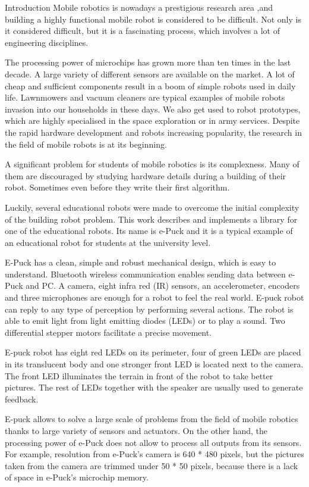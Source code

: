 {Introduction}
\label{chap:intro}
	Mobile robotics is nowadays a prestigious research area ,and building a highly functional 
	mobile robot is considered to be difficult. 
	Not only is it considered difficult, but it is a fascinating process, which
	involves a lot of engineering disciplines.
	
	The processing power of microchips has grown more than ten times in the last decade. 
	A large variety of different sensors are available on the market.	
	A lot of cheap and sufficient components result in a boom of simple robots used in daily life. 
	Lawnmowers and vacuum cleaners are typical examples of mobile robots invasion into our households in these days.
	We also get used to robot prototypes, which are highly specialised in the space exploration or in army services.
	Despite the rapid hardware development and robots increasing popularity,
	the research in the field of mobile robots is at its beginning. 
	
	A significant problem for students of mobile robotics is its complexness. Many of them are discouraged by
	studying hardware  details during a building of their robot. 
	Sometimes even before they write  their first algorithm.

	Luckily, several educational robots were made to overcome the initial complexity of the building robot problem.	
	This work describes and implements a library for one of the educational robots.
	Its name is e-Puck and it is a typical example of an educational robot for students at the university level. 
	
	E-Puck has a clean, simple and robust mechanical design, which is easy to understand.
	Bluetooth wireless communication enables sending data between e-Puck and PC.
	A camera, eight infra red (IR) sensors,	an accelerometer, encoders and three microphones 
	are enough for a robot to feel the real world.
	E-puck robot can reply to any type of perception by performing several actions. 
	The robot is able to emit light from light emitting diodes (LEDs) or to play a sound.
	Two differential stepper motors facilitate a precise movement. 
	
	E-puck robot has eight red LEDs on its perimeter, four of green LEDs are placed in its translucent body and
	one stronger front LED is located next to the camera. 
	The front LED illuminates the terrain in front of the robot to
	take better pictures. The rest of LEDs together with the speaker are usually used to
	generate feedback. 
	
	E-puck allows to solve a large scale of problems from the field of mobile robotics thanks to 
	large variety of sensors and actuators. On the other hand, the processing power of e-Puck does not allow to 
	process all outputs from its sensors. For example, resolution from e-Puck's camera is 640 * 480 pixels,
	but the pictures taken from the camera are trimmed under 50 * 50 pixels, because there is a lack of space in 
	 e-Puck's microchip memory.
	 
